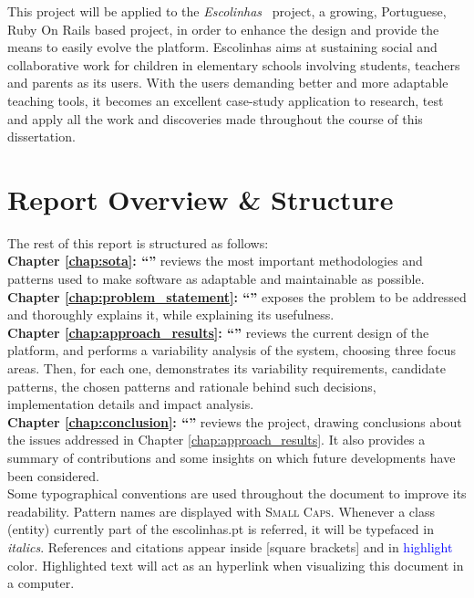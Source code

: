 This project will be applied to the \textit{Escolinhas}~\cite{escolinhas} project, a growing, Portuguese, Ruby On Rails based project, in order to enhance the design and provide the means to easily evolve the platform. Escolinhas aims at sustaining social and collaborative work for children in elementary schools involving students, teachers and parents as its users. With the users demanding better and more adaptable teaching tools, it becomes an excellent case-study application to research, test and apply all the work and discoveries made throughout the course of this dissertation.

\section{Report Overview \& Structure}\label{sec:structure}

The rest of this report is structured as follows:\\

\textbf{Chapter \ref{chap:sota}: ``'' } reviews the most important methodologies and patterns used to make software as adaptable and maintainable as possible.\\

\textbf{Chapter \ref{chap:problem_statement}: ``'' } exposes the problem to be addressed and thoroughly explains it, while explaining its usefulness.\\

\textbf{Chapter \ref{chap:approach_results}: ``'' } reviews the current design of the platform, and performs a variability analysis of the system, choosing three focus areas. Then, for each one, demonstrates its variability requirements, candidate patterns, the chosen patterns and rationale behind such decisions, implementation details and impact analysis.\\


\textbf{Chapter \ref{chap:conclusion}: ``'' } reviews the project, drawing conclusions about the issues addressed in Chapter \ref{chap:approach_results}. It also provides a summary of contributions and some insights on which future developments have been considered.\\

Some typographical conventions are used throughout the document to improve its readability. Pattern names are displayed with \textsc{Small Caps}. Whenever a class (entity) currently part of the escolinhas.pt is referred, it will be typefaced in \textit{italics}. References and citations appear inside [square brackets] and in \textcolor{blue}{highlight} color. Highlighted text will act as an hyperlink when visualizing this document in a computer.

